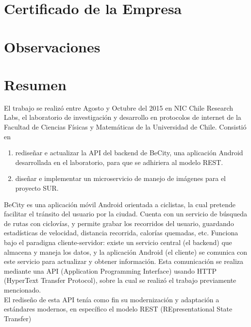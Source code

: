 \documentclass[11pt,letterpaper]{article}
\begin{document}
\renewcommand{\sectionmark}[1]{\markright{\thesection.\ #1}}
\renewcommand{\headrulewidth}{0.5pt}
\renewcommand{\footrulewidth}{0.5pt}

\newpage
\section{Certificado de la Empresa}
\newpage
\section{Observaciones}
\newpage

\tableofcontents
\listoffigures

\newpage
\section{Resumen}

El trabajo se realizó entre Agosto y Octubre del 2015 en NIC Chile Research Labs, el laboratorio de investigación y desarrollo en protocolos de internet de la Facultad de Ciencias Físicas y Matemáticas de la Universidad de Chile. \@ Consistió en
\begin{enumerate}
    \item rediseñar e actualizar la API del backend de BeCity, una aplicación Android desarrollada en el laboratorio, para que se adhiriera al modelo REST.
    \item diseñar e implementar un microservicio de manejo de imágenes para el proyecto SUR.
\end{enumerate}

BeCity es una aplicación móvil Android orientada a ciclistas, la cual pretende facilitar el tránsito del usuario por la ciudad. Cuenta con un servicio de búsqueda de rutas con ciclovías, y permite grabar los recorridos del usuario, guardando estadísticas de velocidad, distancia recorrida, calorías quemadas, etc. Funciona bajo el paradigna cliente-servidor: existe un servicio central (el backend) que almacena y maneja los datos, y la aplicación Android (el cliente) se comunica con este servicio para actualizar y obtener información. Esta comunicación se realiza mediante una API (Application Programming Interface) usando HTTP (HyperText Transfer Protocol), sobre la cual se realizó el trabajo previamente mencionado.\\

El rediseño de esta API tenía como fin su modernización y adaptación a estándares modernos, en específico el modelo REST (REpresentational State Transfer)\\
\end{document}
